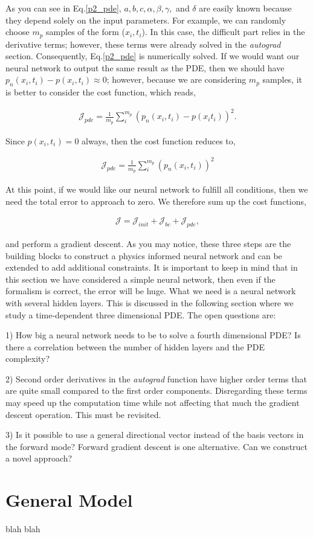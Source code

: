 \documentclass{article}
\begin{document}
As you can see in Eq.\eqref{p2_pde}, $a,b,c,\alpha,\beta,\gamma,$ and $\delta$ are easily known because they depend solely on the input parameters. For example, we can randomly choose $m_p$ samples of the form ($x_i,t_i$). In this case, the difficult part relies in the derivative terms; however, these terms were already solved in the \textit{autograd} section. Consequently, Eq.\eqref{p2_pde} is numerically solved. If we would want our neural network to output the same result as the PDE, then we should have $p_n(x_i,t_i) - p(x_i,t_i) \approx 0$; however, because we are considering $m_p$ samples, it is better to consider the cost function, which reads,

\begin{align}
\mathcal{J}_{pde}=\frac{1}{m_p}\sum_i^{m_p} (p_n(x_i,t_i) - p(x_it_i))^2.
\end{align}

Since $p(x_i,t_i)=0$ always, then the cost function reduces to,

\begin{align}
\mathcal{J}_{pde}=\frac{1}{m_p}\sum_i^{m_p} (p_n(x_i,t_i))^2 
\end{align}

At this point, if we would like our neural network to fulfill all conditions, then we need the total error to approach to zero. We therefore sum up the cost functions,

\begin{align}
\mathcal{J}= \mathcal{J}_{init} + \mathcal{J}_{bc} + \mathcal{J}_{pde},
\end{align}

and perform a gradient descent. As you may notice, these three steps are the building blocks to construct a physics informed neural network and can be extended to add additional constraints.
It is important to keep in mind that in this section we have considered a simple neural network, then even if the formalism is correct, the error will be huge. What we need is a neural network with several hidden layers. This is discussed in the following section where we study a time-dependent three dimensional PDE. The open questions are:

1) How big a neural network needs to be to solve a fourth dimensional PDE? Is there a correlation between the number of hidden layers and the PDE complexity?

2) Second order derivatives in the \textit{autograd} function have higher order terms that are quite small compared to the first order components. Disregarding these terms may speed up the computation time while not affecting that much the gradient descent operation. This must be revisited.

3) Is it possible to use a general directional vector instead of the basis vectors in the forward mode? Forward gradient descent is one alternative. Can we construct a novel approach?



\section{General Model}
blah blah
\end{document}
